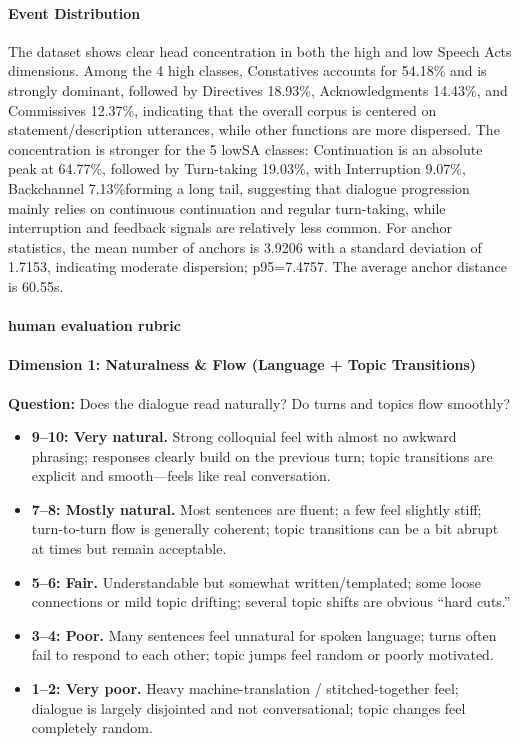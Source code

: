 \paragraph{Event Distribution}
The dataset shows clear head concentration in both the high and low Speech Acts dimensions.
Among the 4 high classes, Constatives accounts for 54.18\% and is strongly dominant, followed by Directives 18.93\%, Acknowledgments 14.43\%, and Commissives 12.37\%, indicating that the overall corpus is centered on statement/description utterances, while other functions are more dispersed.
The concentration is stronger for the 5 lowSA classes: Continuation is an absolute peak at 64.77\%, followed by Turn-taking 19.03\%, with Interruption 9.07\%, Backchannel 7.13\%forming a long tail, suggesting that dialogue progression mainly relies on continuous continuation and regular turn-taking, while interruption and feedback signals are relatively less common.
For anchor statistics, the mean number of anchors is 3.9206 with a standard deviation of 1.7153, indicating moderate dispersion; p95=7.4757. The average anchor distance is 60.55s.

\paragraph{human evaluation rubric}
\paragraph{Dimension 1: Naturalness \& Flow (Language + Topic Transitions)}
\textbf{Question:} Does the dialogue read naturally? Do turns and topics flow smoothly?
\begin{itemize}
  \item \textbf{9--10: Very natural.}
  Strong colloquial feel with almost no awkward phrasing;
  responses clearly build on the previous turn;
  topic transitions are explicit and smooth---feels like real conversation.

  \item \textbf{7--8: Mostly natural.}
  Most sentences are fluent; a few feel slightly stiff;
  turn-to-turn flow is generally coherent;
  topic transitions can be a bit abrupt at times but remain acceptable.

  \item \textbf{5--6: Fair.}
  Understandable but somewhat written/templated;
  some loose connections or mild topic drifting;
  several topic shifts are obvious ``hard cuts.''

  \item \textbf{3--4: Poor.}
  Many sentences feel unnatural for spoken language;
  turns often fail to respond to each other;
  topic jumps feel random or poorly motivated.

  \item \textbf{1--2: Very poor.}
  Heavy machine-translation / stitched-together feel;
  dialogue is largely disjointed and not conversational;
  topic changes feel completely random.
\end{itemize}

